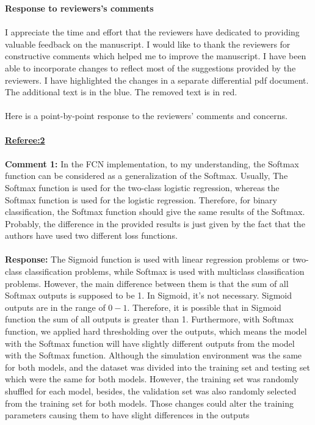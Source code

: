 \documentclass[11pt,a4paper]{article}
\begin{document}
	\textbf{Response to reviewers's comments} 
	\\ \\
	I appreciate the time and effort that the reviewers have dedicated to providing valuable feedback on the manuscript. I would like to thank the reviewers for constructive comments which helped me to improve the manuscript. I have been able to incorporate changes to reflect most of the suggestions provided by the reviewers. I have highlighted the changes in a separate differential pdf document. The additional text is in the blue. The removed text is in red.
	\\ \\
	Here is a point-by-point response to the reviewers' comments and concerns.
	\\ \\
	\underline{\textbf{Referee:2}} 	
	\\
	\\
	\textbf{Comment 1:} In the FCN implementation, to my understanding, the Softmax function can be considered as a generalization of the Softmax. Usually, The Softmax function is used for the two-class logistic regression, whereas the Softmax function is used for the logistic regression.
	Therefore, for binary classification, the Softmax function should give the same results of the Softmax. Probably, the difference in the provided results is just given by the fact that the authors have used two different loss functions.
	\\ \\
	\color{blue}\textbf{Response:} The Sigmoid function is used with linear regression problems or two-class classification problems,
	while Softmax is used with multiclass classification problems. However, the main difference between
	them is that the sum of all Softmax outputs is supposed to be 1. In Sigmoid, it's not necessary. Sigmoid outputs
	are in the range of \(0-1\). Therefore, it is possible that in Sigmoid function the sum of all outputs is greater than
	1. Furthermore, with Softmax function, we applied hard thresholding over the outputs, which means the model
	with the Softmax function will have slightly different outputs from the model with the Softmax function. Although
	the simulation environment was the same for both models, and the dataset was divided into the training
	set and testing set which were the same for both models. However, the training set was randomly shuffled for
	each model, besides, the validation set was also randomly selected from the training set for both models. Those
	changes could alter the training parameters causing them to have slight differences in the outputs
\end{document}
